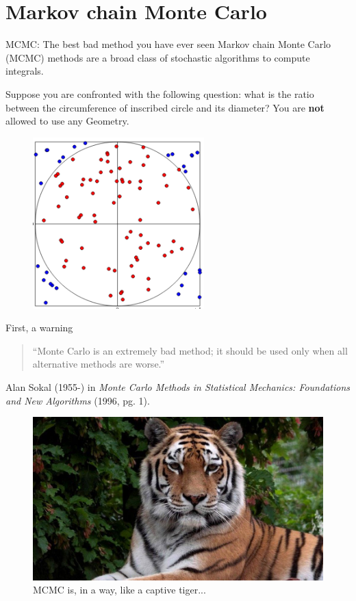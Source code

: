\section*{Markov chain Monte Carlo}
\begin{frame}{MCMC: The best bad method you have ever seen}
Markov chain Monte Carlo (MCMC) methods are a broad class of stochastic algorithms to compute integrals.

Suppose you are confronted with the following question: what is the ratio between the circumference of inscribed circle and its diameter?
You are \textbf{not} allowed to use any Geometry.
\begin{figure}
\includegraphics[scale=0.85]{figures/pi_MC.png}
\end{figure}
\end{frame}
\begin{frame}{First, a warning}
\begin{quote}
 ``Monte Carlo is an extremely bad method; it should be used only when all alternative methods are worse.''
\end{quote}
Alan Sokal (1955-) in \textit{Monte Carlo Methods in Statistical Mechanics: Foundations and New Algorithms} (1996, pg. 1).
\begin{figure}
\includegraphics[scale=0.25]{figures/tiger.jpg}
\caption{MCMC is, in a way, like a captive tiger...}
\end{figure}
\end{frame}
